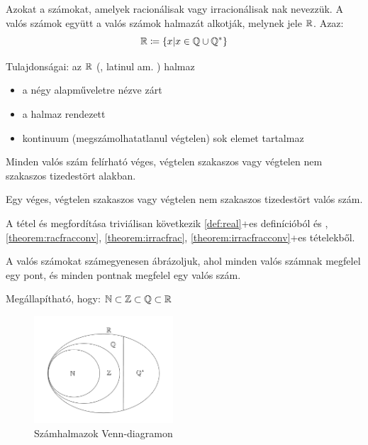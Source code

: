 \begin{defin2}
\label{def:real}
Azokat a számokat, amelyek racionálisak vagy irracionálisak nak nevezzük. A valós számok együtt a valós számok halmazát alkotják,
melynek jele $\mathbb{R}$. Azaz:
\[
  \mathbb{R} \coloneqq \{x | x \in \mathbb{Q} \cup \mathbb{Q^*}\}
\]

Tulajdonságai: az $\mathbb{R}$ (, latinul am. )
halmaz
\begin{itemize}
\item a négy alapműveletre nézve zárt
\item a halmaz rendezett
\item kontinuum (megszámolhatatlanul végtelen) sok elemet tartalmaz
\end{itemize}
\end{defin2}

\begin{theorem2}
Minden valós szám felírható véges, végtelen szakaszos vagy végtelen nem
szakaszos tizedestört alakban.
\end{theorem2}

\begin{theoremconv2}
Egy véges, végtelen szakaszos vagy végtelen nem szakaszos tizedestört  valós
szám.
\end{theoremconv2}

\begin{proof2}
A tétel és megfordítása triviálisan következik \atold\ref{def:real}+es{}
definícióból és , \ref{theorem:racfracconv},
\ref{theorem:irracfrac}, \told\ref{theorem:irracfracconv}+es{} tételekből.
\end{proof2}

\begin{note2}
A valós számokat számegyenesen ábrázoljuk, ahol minden valós számnak megfelel
egy pont, és minden pontnak megfelel egy valós szám.
\end{note2}

\begin{note2}
Megállapítható, hogy:
$\mathbb{N} \subset \mathbb{Z} \subset \mathbb{Q} \subset \mathbb{R}$

\begin{figure}[!h]
	\centering
	\includegraphics[height=4cm]{../images/009_sets_of_numbers}
	\caption{Számhalmazok Venn-diagramon} 
	\label{fig:numberset}
\end{figure}
\end{note2}

